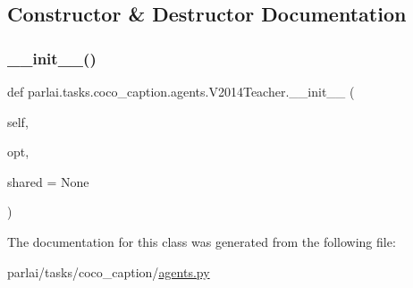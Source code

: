 \subsection{Constructor \& Destructor Documentation}
\mbox{\label{classparlai_1_1tasks_1_1coco__caption_1_1agents_1_1V2014Teacher_a270de04c549341bc63faf54b5f448108}} 
\subsubsection{\texorpdfstring{\+\_\+\+\_\+init\+\_\+\+\_\+()}{\_\_init\_\_()}}
{\footnotesize\ttfamily def parlai.\+tasks.\+coco\+\_\+caption.\+agents.\+V2014\+Teacher.\+\_\+\+\_\+init\+\_\+\+\_\+ (\begin{DoxyParamCaption}\item[{}]{self,  }\item[{}]{opt,  }\item[{}]{shared = {\ttfamily None} }\end{DoxyParamCaption})}



The documentation for this class was generated from the following file\+:\begin{DoxyCompactItemize}
\item 
parlai/tasks/coco\+\_\+caption/\hyperlink{parlai_2tasks_2coco__caption_2agents_8py}{agents.\+py}\end{DoxyCompactItemize}

